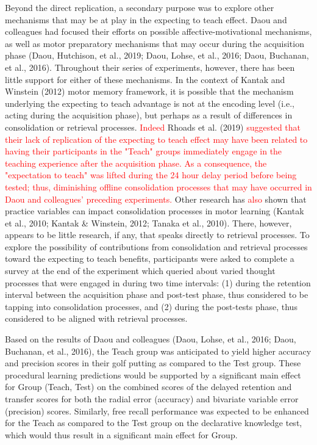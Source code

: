 \documentclass[
  english,
  man,floatsintext]{apa7}
\begin{document}
Beyond the direct replication, a secondary purpose was to explore other mechanisms that may be at play in the expecting to teach effect. Daou and colleagues had focused their efforts on possible affective-motivational mechanisms, as well as motor preparatory mechanisms that may occur during the acquisition phase (Daou, Hutchison, et al., 2019; Daou, Lohse, et al., 2016; Daou, Buchanan, et al., 2016). Throughout their series of experiments, however, there has been little support for either of these mechanisms. In the context of Kantak and Winstein (2012) motor memory framework, it is possible that the mechanism underlying the expecting to teach advantage is not at the encoding level (i.e., acting during the acquisition phase), but perhaps as a result of differences in consolidation or retrieval processes. \textcolor{red}{Indeed} Rhoads et al. (2019) \textcolor{red}{suggested that their lack of replication of the expecting to teach effect may have been related to having their participants in the "Teach" groups immediately engage in the teaching experience after the acquisition phase. As a consequence, the "expectation to teach" was lifted during the 24 hour delay period before being tested; thus, diminishing offline consolidation processes that may have occurred in Daou and colleagues’ preceding experiments.} Other research has \textcolor{red}{also} shown that practice variables can impact consolidation processes in motor learning (Kantak et al., 2010; Kantak \& Winstein, 2012; Tanaka et al., 2010). There, however, appears to be little research, if any, that speaks directly to retrieval processes. To explore the possibility of contributions from consolidation and retrieval processes toward the expecting to teach benefits, participants were asked to complete a survey at the end of the experiment which queried about varied thought processes that were engaged in during two time intervals: (1) during the retention interval between the acquisition phase and post-test phase, thus considered to be tapping into consolidation processes, and (2) during the post-tests phase, thus considered to be aligned with retrieval processes.

Based on the results of Daou and colleagues (Daou, Lohse, et al., 2016; Daou, Buchanan, et al., 2016), the Teach group was anticipated to yield higher accuracy and precision scores in their golf putting as compared to the Test group. These procedural learning predictions would be supported by a significant main effect for Group (Teach, Test) on the combined scores of the delayed retention and transfer scores for both the radial error (accuracy) and bivariate variable error (precision) scores. Similarly, free recall performance was expected to be enhanced for the Teach as compared to the Test group on the declarative knowledge test, which would thus result in a significant main effect for Group.
\end{document}
